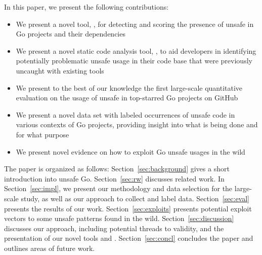 In this paper, we present the following contributions:

\begin{itemize}
\item We present a novel tool, \toolUsage{}, for detecting and scoring the presence of unsafe in Go projects and their dependencies
\item We present a novel static code analysis tool, \toolSA{}, to aid developers in identifying potentially problematic unsafe usage in their code base that were previously uncaught with existing tools
\item We present to the best of our knowledge the first large-scale quantitative evaluation on the usage of unsafe in \projsAnalyzed{} top-starred Go projects on GitHub
\item We present a novel data set with  labeled occurrences of unsafe code in various contexts of Go projects, providing insight into what is being done and for what purpose
\item We present novel evidence on how to exploit Go unsafe usages in the wild
\end{itemize}

The paper is organized as follows:
Section~\ref{sec:background} gives a short introduction into unsafe Go.
Section~\ref{sec:rw} discusses related work. 
In Section~\ref{sec:impl}, we present our methodology and data selection for the large-scale study, as well as our approach to collect and label data.
Section~\ref{sec:eval} presents the results of our work.
Section~\ref{sec:exploits} presents potential exploit vectors to some unsafe patterns found in the wild.
Section~\ref{sec:discussion} discusses our approach, including potential threads to validity, and the presentation of our novel tools \toolUsage{} and \toolSA{}.
Section~\ref{sec:concl} concludes the paper and outlines areas of future work.
